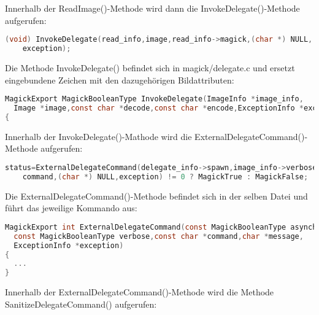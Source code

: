 Innerhalb der ReadImage()-Methode wird dann die InvokeDelegate()-Methode aufgerufen:\\

\begin{lstlisting}[firstnumber=523, language=C, caption=magick/constitue.c Aufruf InvokeDelegate(),label={lst:lstlisting}]
  (void) InvokeDelegate(read_info,image,read_info->magick,(char *) NULL,
    exception);
\end{lstlisting}
\vspace{5mm}

Die Methode InvokeDelegate() befindet sich in magick/delegate.c und ersetzt eingebundene Zeichen mit den dazugehörigen Bildattributen:\\

\begin{lstlisting}[firstnumber=1097, language=C, caption=magick/delegate.c InvokeDelegate(),label={lst:lstlisting}]
MagickExport MagickBooleanType InvokeDelegate(ImageInfo *image_info,
  Image *image,const char *decode,const char *encode,ExceptionInfo *exception)
{
\end{lstlisting}
\vspace{5mm}

Innerhalb der InvokeDelegate()-Mathode wird die ExternalDelegateCommand()-Methode aufgerufen:\\

\begin{lstlisting}[firstnumber=1301, language=C, caption=magick/delegate.c Aufruf ExternalDelegateCommand(),label={lst:lstlisting}]
  status=ExternalDelegateCommand(delegate_info->spawn,image_info->verbose,
    command,(char *) NULL,exception) != 0 ? MagickTrue : MagickFalse;
\end{lstlisting}
\vspace{5mm}

Die ExternalDelegateCommand()-Methode befindet sich in der selben Datei und führt das jeweilige Kommando aus:\\

\begin{lstlisting}[firstnumber=346, language=C, caption=magick/delegate.c ExternalDelegateCommand(),label={lst:lstlisting}]
MagickExport int ExternalDelegateCommand(const MagickBooleanType asynchronous,
  const MagickBooleanType verbose,const char *command,char *message,
  ExceptionInfo *exception)
{
  ...
}
\end{lstlisting}
\vspace{5mm}

Innerhalb der ExternalDelegateCommand()-Methode wird die Methode SanitizeDelegateCommand() aufgerufen:\\

